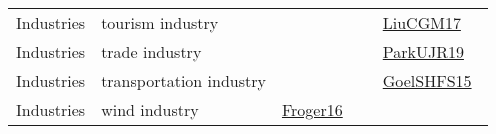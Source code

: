 {\begin{longtable}{lp{3cm}>{\raggedright\arraybackslash}p{6cm}>{\raggedright\arraybackslash}p{6cm}>{\raggedright\arraybackslash}p{8cm}}
Industries & tourism industry &  &  & \href{../works/LiuCGM17.pdf}{LiuCGM17}~\cite{LiuCGM17}\\
Industries & trade industry &  &  & \href{../works/ParkUJR19.pdf}{ParkUJR19}~\cite{ParkUJR19}\\
Industries & transportation industry &  &  & \href{../works/GoelSHFS15.pdf}{GoelSHFS15}~\cite{GoelSHFS15}\\
Industries & wind industry & \href{../works/Froger16.pdf}{Froger16}~\cite{Froger16} &  & \\
\end{longtable}
}

